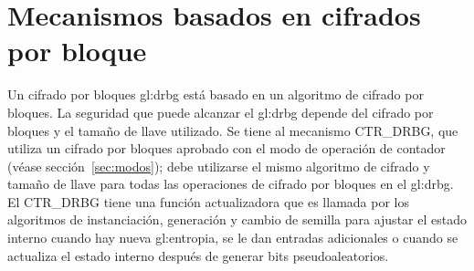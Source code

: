 %
%
\section{Mecanismos basados en cifrados por bloque}

Un cifrado por bloques \gls{gl:drbg} está basado en un algoritmo de cifrado por
bloques. La seguridad que puede alcanzar el \gls{gl:drbg} depende del cifrado
por bloques y el tamaño de llave utilizado. Se tiene al mecanismo CTR\_DRBG,
que utiliza un cifrado por bloques aprobado con el modo de operación de
contador (véase sección~\ref{sec:modos}); debe utilizarse el mismo algoritmo
de cifrado y tamaño de llave para todas las operaciones de cifrado por bloques
en el \gls{gl:drbg}. El CTR\_DRBG tiene una función actualizadora que es llamada
por los algoritmos de instanciación, generación y cambio de semilla para ajustar
el estado interno cuando hay nueva \gls{gl:entropia}, se le dan entradas
adicionales o cuando se actualiza el estado interno después de generar bits
pseudoaleatorios.
